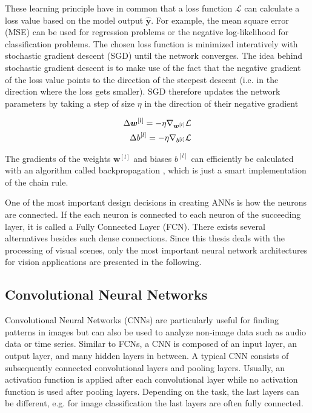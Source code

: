 These learning principle have in common that a loss function \(\mathcal{L}\) can calculate a loss value based on the model output \(\boldsymbol{\hat{y}}\). 
For example, the mean square error (MSE) can be used for regression problems or the negative log-likelihood for classification problems.
The chosen loss function is minimized interatively with stochastic gradient descent (SGD) until the network converges.
The idea behind stochastic gradient descent is to make use of the fact that the negative gradient of the loss value points to the direction of the steepest descent (i.e. in the direction where the loss gets smaller).
SGD therefore updates the network parameters by taking a step of size \(\eta\) in the direction of their negative gradient

\begin{equation}\eqlbl{sgd}
	\begin{aligned}
		\Delta \boldsymbol{w}^{[l]} = -\eta \nabla_{\boldsymbol{w}^{[l]}} \mathcal{L}\\
		\Delta b^{[l]} = -\eta \nabla_{b^{[l]}} \mathcal{L}
	\end{aligned}
\end{equation}

The gradients of the weights \(\boldsymbol{w}^{[l]}\) and biases \(b^{[l]}\) can efficiently be calculated with an algorithm called backpropagation , which is just a smart implementation of the chain rule.

One of the most important design decisions in creating ANNs is how the neurons are connected.
If the each neuron is connected to each neuron of the succeeding layer, it is called a Fully Connected Layer (FCN). 
There exists several alternatives besides such dense connections.
Since this thesis deals with the processing of visual scenes, only the most important neural network architectures for vision applications are presented in the following.

\subsection{Convolutional Neural Networks}
Convolutional Neural Networks (CNNs) are particularly useful for finding patterns in images but can also be used to analyze non-image data such as audio data or time series.
Similar to FCNs, a CNN is composed of an input layer, an output layer, and many hidden layers in between.
A typical CNN consists of subsequently connected convolutional layers and pooling layers.
Usually, an activation function is applied after each convolutional layer while no activation function is used after pooling layers.
Depending on the task, the last layers can be different, e.g. for image classification the last layers are often fully connected.

